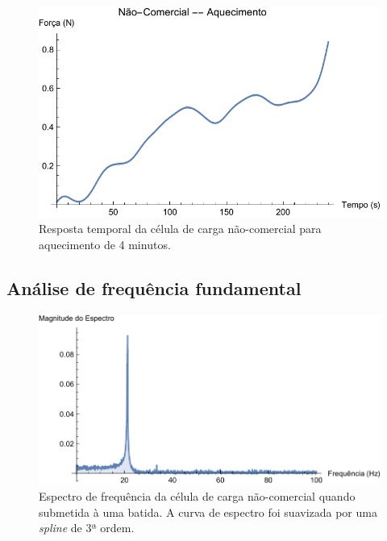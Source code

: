 \documentclass[a4paper]{instrumentacao}
\begin{document}
\begin{figure}[H]
\center
\includegraphics[width=\textwidth]{NaoComercial-Aquecimento.pdf}
\caption{Resposta temporal da célula de carga não-comercial para aquecimento de 4 minutos.}
\label{fig:celula-nao-comercial-resultado-aquecimento}
\end{figure}

\subsection{Análise de frequência fundamental}

\begin{figure}[H]
\center
\includegraphics[width=\textwidth]{NaoComercial-Spectrum.pdf}
\caption{Espectro de frequência da célula de carga não-comercial quando submetida à uma batida. A curva de espectro foi suavizada por uma \textit{spline} de 3ª ordem.}
\label{fig:celula-nao-comercial-resultado-espectro}
\end{figure}
\end{document}
